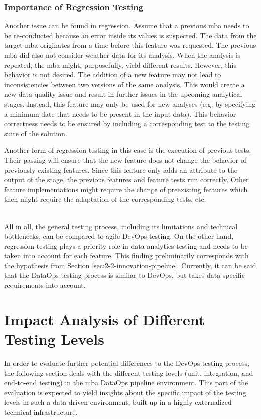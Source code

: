 \subsubsection{Importance of Regression Testing}
Another issue can be found in regression. Assume that a previous \ac{mba} needs to be re-conducted because an error inside its values is suspected. The data from the target \ac{mba} originates from a time before this feature was requested. The previous \ac{mba} did also not consider weather data for its analysis. When the analysis is repeated, the \ac{mba} might, purposefully, yield different results. However, this behavior is not desired. The addition of a new feature may not lead to inconsistencies between two versions of the same analysis. This would create a new data quality issue and result in further issues in the upcoming analytical stages. Instead, this feature may only be used for new analyses (e.g. by specifying a minimum date that needs to be present in the input data). This behavior correctness needs to be ensured by including a corresponding test to the testing suite of the solution.

Another form of regression testing in this case is the execution of previous tests. Their passing will ensure that the new feature does not change the behavior of previously existing features. Since this feature only adds an attribute to the output of the stage, the previous features and feature tests run correctly. Other feature implementations might require the change of preexisting features which then might require the adaptation of the corresponding tests, etc. \\\

All in all, the general testing process, including its limitations and technical bottlenecks, can be compared to agile DevOps testing. On the other hand, regression testing plays a priority role in data analytics testing and needs to be taken into account for each feature. This finding preliminarily corresponds with the hypothesis from Section \ref{sec:2-2-innovation-pipeline}. Currently, it can be said that the DataOps testing process is similar to DevOps, but takes data-specific requirements into account.

\section{Impact Analysis of Different Testing Levels}
In order to evaluate further potential differences to the DevOps testing process, the following section deals with the different testing levels (unit, integration, and end-to-end testing) in the \ac{mba} DataOps pipeline environment. This part of the evaluation is expected to yield insights about the specific impact of the testing levels in such a data-driven environment, built up in a highly externalized technical infrastructure. 

